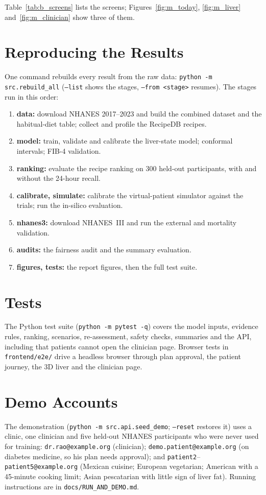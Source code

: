 Table~\ref{tab:b_screens} lists the screens; Figures~\ref{fig:m_today},
\ref{fig:m_liver} and~\ref{fig:m_clinician} show three of them.

\section{Reproducing the Results}
\label{app:b_reproduce}

One command rebuilds every result from the raw data:
\texttt{python -m src.rebuild\_all} (\texttt{--list} shows the stages,
\texttt{--from <stage>} resumes). The stages run in this order:

\begin{enumerate}
    \item \textbf{data:} download NHANES 2017--2023 and build the combined
          dataset and the habitual-diet table; collect and profile the
          RecipeDB recipes.
    \item \textbf{model:} train, validate and calibrate the liver-state model;
          conformal intervals; FIB-4 validation.
    \item \textbf{ranking:} evaluate the recipe ranking on 300 held-out
          participants, with and without the 24-hour recall.
    \item \textbf{calibrate, simulate:} calibrate the virtual-patient
          simulator against the trials; run the in-silico evaluation.
    \item \textbf{nhanes3:} download NHANES~III and run the external and
          mortality validation.
    \item \textbf{audits:} the fairness audit and the summary evaluation.
    \item \textbf{figures, tests:} the report figures, then the full test
          suite.
\end{enumerate}

\section{Tests}
\label{app:b_tests}

The Python test suite (\texttt{python -m pytest -q}) covers the model inputs,
evidence rules, ranking, scenarios, re-assessment, safety checks, summaries
and the API, including that patients cannot open the clinician page. Browser
tests in \nolinkurl{frontend/e2e/} drive a headless browser through plan approval,
the patient journey, the 3D liver and the clinician page.

\section{Demo Accounts}
\label{app:b_demo}

The demonstration (\texttt{python -m src.api.seed\_demo}; \texttt{--reset}
restores it) uses a clinic, one clinician and five held-out NHANES
participants who were never used for training: \texttt{dr.rao@example.org}
(clinician); \texttt{demo.patient@example.org} (on diabetes medicine, so his
plan needs approval); and \texttt{patient2}--\texttt{patient5@example.org}
(Mexican cuisine; European vegetarian; American with a 45-minute cooking
limit; Asian pescatarian with little sign of liver fat). Running instructions
are in \nolinkurl{docs/RUN_AND_DEMO.md}.
